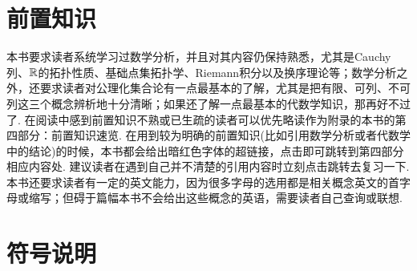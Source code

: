 \section*{前置知识}
本书要求读者系统学习过数学分析，并且对其内容仍保持熟悉，尤其是Cauchy列、$\mathbb{R}$的拓扑性质、基础点集拓扑学、Riemann积分以及换序理论等；数学分析之外，还要求读者对公理化集合论有一点最基本的了解，尤其是把有限、可列、不可列这三个概念辨析地十分清晰；如果还了解一点最基本的代数学知识，那再好不过了. 在阅读中感到前置知识不熟或已生疏的读者可以优先略读作为附录的本书的第四部分：前置知识速览. 在用到较为明确的前置知识(比如引用数学分析或者代数学中的结论)的时候，本书都会给出暗红色字体的超链接，点击即可跳转到第四部分相应内容处. 建议读者在遇到自己并不清楚的引用内容时立刻点击跳转去复习一下. 本书还要求读者有一定的英文能力，因为很多字母的选用都是相关概念英文的首字母或缩写；但碍于篇幅本书不会给出这些概念的英语，需要读者自己查询或联想.

\section*{符号说明}

